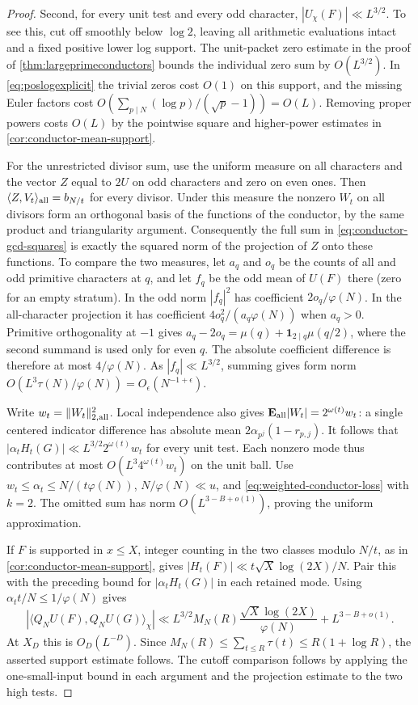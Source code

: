 \documentclass[11pt,a4paper]{article}
\numberwithin{equation}{section}
\begin{document}
\begin{proof}
Second, for every unit test and every odd character,
$|U_\chi(F)|\ll L^{3/2}$. To see this, cut off smoothly below
$\log 2$, leaving all arithmetic evaluations intact and a fixed
positive lower log support. The unit-packet zero estimate in
the proof of \cref{thm:largeprimeconductors} bounds the individual
zero sum by $O(L^{3/2})$. In \eqref{eq:poslogexplicit} the trivial
zeros cost $O(1)$ on this support, and the missing Euler factors
cost $O(\sum_{p\mid N}(\log p)/(\sqrt p-1))=O(L)$.
Removing proper powers costs $O(L)$ by the pointwise square and
higher-power estimates in \cref{cor:conductor-mean-support}.

For the unrestricted divisor sum, use the uniform measure on
all characters and the vector $Z$ equal to $2U$ on odd characters
and zero on even ones. Then $\langle Z,V_t\rangle_{\rm all}=
b_{N/t}$ for every divisor. Under this measure the nonzero $W_t$
on all divisors form an orthogonal basis of the functions of the
conductor, by the same product and triangularity argument.
Consequently the full sum in \eqref{eq:conductor-gcd-squares}
is exactly the squared norm of the projection of $Z$ onto these
functions. To compare the two measures, let $a_q$ and $o_q$ be
the counts of all and odd primitive characters at $q$, and let
$f_q$ be the odd mean of $U(F)$ there (zero for an empty stratum).
In the odd norm $|f_q|^2$ has coefficient $2o_q/\varphi(N)$.
In the all-character projection it has coefficient
$4o_q^2/(a_q\varphi(N))$ when $a_q>0$. Primitive orthogonality
at $-1$ gives $a_q-2o_q=\mu(q)+\mathbf1_{2\mid q}\mu(q/2)$,
where the second summand is used only for even $q$.
The absolute coefficient difference is therefore at most
$4/\varphi(N)$. As $|f_q|\ll L^{3/2}$, summing gives form norm
$O(L^3\tau(N)/\varphi(N))=O_\epsilon(N^{-1+\epsilon})$.

Write $w_t=\|W_t\|_{2,\rm all}^2$. Local independence also gives
$\mathbf E_{\rm all}|W_t|=2^{\omega(t)}w_t$: a single centered
indicator difference has absolute mean $2\alpha_{p^j}(1-r_{p,j})$.
It follows that $|\alpha_t H_t(G)|\ll L^{3/2}2^{\omega(t)}w_t$
for every unit test. Each nonzero mode thus contributes at most
$O(L^3 4^{\omega(t)} w_t)$ on the unit ball. Use
$w_t\le\alpha_t\le N/(t\varphi(N))$, $N/\varphi(N)\ll u$, and
\eqref{eq:weighted-conductor-loss} with $k=2$. The omitted sum
has norm $O(L^{3-B+o(1)})$, proving the uniform approximation.

If $F$ is supported in $x\le X$, integer counting in the two
classes modulo $N/t$, as in \cref{cor:conductor-mean-support},
gives $|H_t(F)|\ll t\sqrt X\log(2X)/N$. Pair this with the
preceding bound for $|\alpha_t H_t(G)|$ in each retained mode.
Using $\alpha_t t/N\le1/\varphi(N)$ gives
\[
 |\langle Q_NU(F),Q_NU(G)\rangle_\chi|
 \ll L^{3/2} M_N(R)\frac{\sqrt X\log(2X)}{\varphi(N)}
              +L^{3-B+o(1)} .
\]
At $X_D$ this is $O_D(L^{-D})$. Since
$M_N(R)\le\sum_{t\le R}\tau(t)\le R(1+\log R)$, the asserted
support estimate follows. The cutoff comparison follows by
applying the one-small-input bound in each argument and the
projection estimate to the two high tests.
\end{proof}
\end{document}
